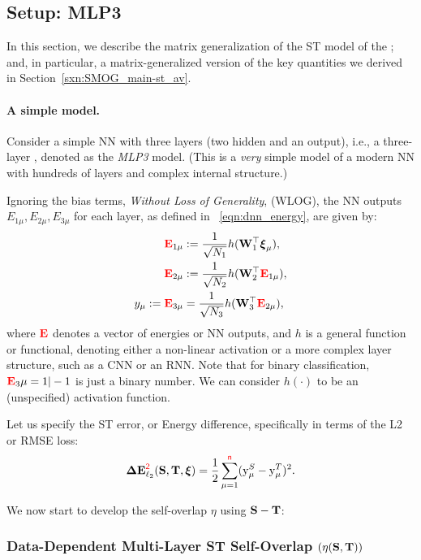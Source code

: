 \subsection{\MultiLayer Setup: MLP3}
\label{sxn:matgen_mlp3}

In this section, we describe the matrix generalization of the ST  model of the \LinearPerceptron; and, 
in particular, a matrix-generalized version of the key quantities we derived in Section~\ref{sxn:SMOG_main-st_av}.

\paragraph{A simple model.}

Consider a simple NN with three layers (two hidden and an output), i.e., a three-layer \MultiLayerPerceptron, denoted as the \emph{MLP3} model.
(This is a \emph{very} simple model of a modern NN with hundreds of layers and complex internal structure.)

Ignoring the bias terms, \emph{Without Loss of Generality}, (WLOG), the NN outputs
 $E_{1\mu},E_{2\mu},E_{3\mu}$ for each layer, as defined in \EQN~\ref{eqn:dnn_energy}, are given by:
\begin{align}
\nonumber
  {{\color{red}\sf{\mathbf{E}}}}_{1\mu} &:= \frac{1}{\sqrt{N_1}} h ({\mathbf{W}}_1^\top \boldsymbol{\xi}_{\mu}) , \\
\nonumber
  {{\color{red}\sf{\mathbf{E}}}}_{2\mu} &:= \frac{1}{\sqrt{N_2}} h ({\mathbf{W}}_2^\top {{\color{red}\sf{\mathbf{E}}}}_{1\mu})     , \\
\label{eqn:nflow}
             y_{\mu} := {{\color{red}\sf{\mathbf{E}}}}_{3\mu} &= \frac{1}{\sqrt{N_3}} h ({\mathbf{W}}_{3}^\top {{\color{red}\sf{\mathbf{E}}}}_{2\mu})     ,
\end{align}
where ${{\color{red}\sf{\mathbf{E}}}}$ denotes a vector of energies or NN outputs, and $h$ is a general function or functional, denoting either a non-linear activation or a more complex layer structure, such as a CNN or an RNN.  Note that for binary classification, ${{\color{red}\sf{\mathbf{E}}}}_3{\mu}=1|-1$ is just a binary number.  
We can consider $h(\cdot)$ to be an (unspecified) activation function.

Let us specify the ST error, or Energy difference, specifically in terms of the L2 or RMSE loss:
\begin{equation}
\label{eqn:DE}
\mathbf{\Delta {E}}^{{\color{red}\sf{2}}}_{\ell_2}({\mathbf{S}},{\mathbf{T}}, \boldsymbol{\xi}) = \frac{1}{2}\sum_{\mu=1}^{{\color{red}\sf{n}}} (\mathrm{y}_{\mu}^{S} - \mathrm{y}_{\mu}^{T})^2.
\end{equation}

We now start to develop the self-overlap \(\eta\) using \({\mathbf{S}} - {\mathbf{T}}\):

\subsubsection{Data-Dependent Multi-Layer ST Self-Overlap
\texorpdfstring{$(\eta({\mathbf{S}},{\mathbf{T}}))$}{ETA(S, T)}}

